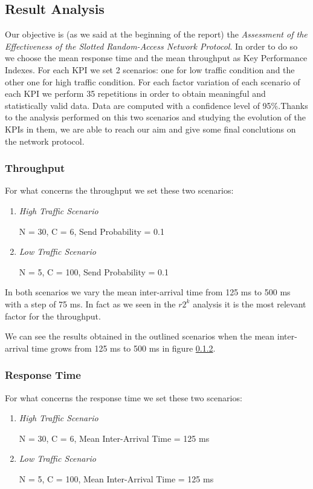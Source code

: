 \subsection{Result Analysis}
Our objective is (as we said at the beginning of the report) the \textit{Assessment of the Effectiveness of the Slotted Random-Access Network Protocol}. In order to do so we choose the mean response time and the mean throughput as Key Performance Indexes. For each KPI we set 2 scenarios: one for low traffic condition and the other one for high traffic condition. For each factor variation of each scenario of each KPI we perform 35 repetitions in order to obtain meaningful and statistically valid data. Data are computed with a confidence level of 95\%.Thanks to the analysis performed on this two scenarios and studying the evolution of the KPIs in them, we are able to reach our aim and give some final conclutions on the network protocol. 

\subsubsection{Throughput}
For what concerns the throughput we set these two scenarios:
\begin{enumerate}
	\item \textit{High Traffic Scenario}
	
	N = 30, C = 6, Send Probability = 0.1
	\item \textit{Low Traffic Scenario}
	
	N = 5, C = 100, Send Probability = 0.1
\end{enumerate}

\noindent In both scenarios we vary the mean inter-arrival time from 125 ms to 500 ms with a step of 75 ms. In fact as we seen in the $r2^k$ analysis it is the most relevant factor for the throughput. 

\noindent We can see the results obtained in the outlined scenarios when the mean inter-arrival time grows from 125 ms to 500 ms in figure \ref{}.

\subsubsection{Response Time}
For what concerns the response time we set these two scenarios:
\begin{enumerate}
	\item \textit{High Traffic Scenario}
	
	N = 30, C = 6, Mean Inter-Arrival Time = 125 ms
	\item \textit{Low Traffic Scenario}
	
	N = 5, C = 100, Mean Inter-Arrival Time = 125 ms
\end{enumerate}

